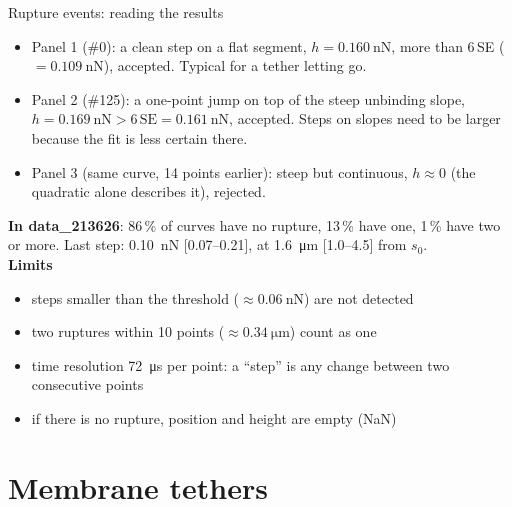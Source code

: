 \documentclass[aspectratio=169,9pt]{beamer}
\begin{document}
\begin{frame}{Rupture events: reading the results}
\small
\begin{itemize}
\item Panel 1 (\#0): a clean step on a flat segment, $h=\SI{0.160}{\nano\newton}$, more than 6\,SE ($=\SI{0.109}{\nano\newton}$), accepted. Typical for a tether letting go.
\item Panel 2 (\#125): a one-point jump on top of the steep unbinding slope, $h=\SI{0.169}{\nano\newton}>6\,\mathrm{SE}=\SI{0.161}{\nano\newton}$, accepted. Steps on slopes need to be larger because the fit is less certain there.
\item Panel 3 (same curve, 14 points earlier): steep but continuous, $h\approx 0$ (the quadratic alone describes it), rejected.
\end{itemize}
\textbf{In data\_213626}: 86\,\% of curves have no rupture, 13\,\% have one, 1\,\% have two or more. Last step: \SI{0.10}{\nano\newton} [0.07--0.21], at \SI{1.6}{\micro\metre} [1.0--4.5] from $s_0$.\\[6pt]
\textbf{Limits}
\begin{itemize}
\item steps smaller than the threshold ($\approx\SI{0.06}{\nano\newton}$) are not detected
\item two ruptures within 10 points ($\approx\SI{0.34}{\micro\metre}$) count as one
\item time resolution \SI{72}{\micro\second} per point: a ``step'' is any change between two consecutive points
\item if there is no rupture, position and height are empty (NaN)
\end{itemize}
\end{frame}

\section{Membrane tethers}
\end{document}
